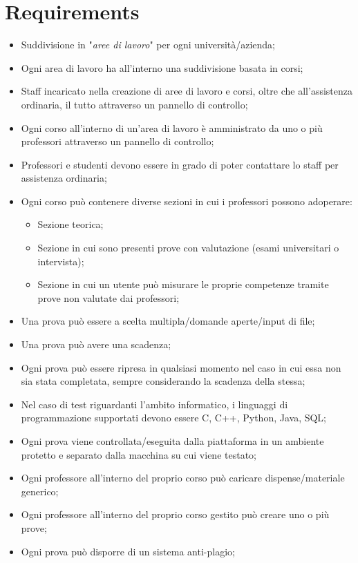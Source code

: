 \documentclass[a4paper,11pt]{report}
\begin{document}
	\section*{Requirements}
	\begin{itemize}
		\item Suddivisione in "\textit{aree di lavoro}" per ogni università/azienda;
		\item Ogni area di lavoro ha all'interno una suddivisione basata in corsi;
		\item Staff incaricato nella creazione di aree di lavoro e corsi, oltre che all'assistenza ordinaria, il tutto attraverso un pannello di controllo;
		\item Ogni corso all'interno di un'area di lavoro è amministrato da uno o più professori attraverso un pannello di controllo;
		\item Professori e studenti devono essere in grado di poter contattare lo staff per assistenza ordinaria;
		\item Ogni corso può contenere diverse sezioni in cui i professori possono adoperare:
		\begin{itemize}
			\item Sezione teorica;
			\item Sezione in cui sono presenti prove con valutazione (esami universitari o intervista);
			\item Sezione in cui un utente può misurare le proprie competenze tramite prove non valutate dai professori;
		\end{itemize}
	\item Una prova può essere a scelta multipla/domande aperte/input di file;
	\item Una prova può avere una scadenza;
	\item Ogni prova può essere ripresa in qualsiasi momento nel caso in cui essa non sia stata completata, sempre considerando la scadenza della stessa;
	\item Nel caso di test riguardanti l'ambito informatico, i linguaggi di programmazione supportati devono essere C, C++, Python, Java, SQL;
	\item Ogni prova viene controllata/eseguita dalla piattaforma in un ambiente protetto e separato dalla macchina su cui viene testato;
	\item Ogni professore all'interno del proprio corso può caricare dispense/materiale generico;
	\item Ogni professore all'interno del proprio corso gestito può creare uno o più prove;
	\item Ogni prova può disporre di un sistema anti-plagio;

\end{itemize}
\end{document}
